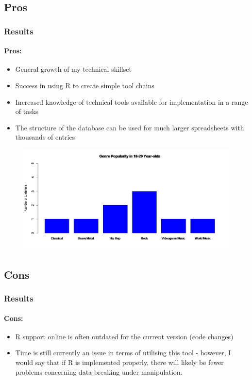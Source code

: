 \documentclass[aspectratio=1610]{beamer}
\begin{document}
\subsection{Pros}
\begin{frame}
\frametitle{Results}
\framesubtitle{Pros:}
\begin{itemize}
\item General growth of my technical skillset
\item Success in using R to create simple tool chains
\item Increased knowledge of technical tools available for implementation in a range of tasks
\item The structure of the database can be used for much larger spreadsheets with thousands of entries
\end{itemize}
\begin{figure}[h]
\includegraphics[scale=0.3]{Final}
\end{figure}
\end{frame}
\subsection{Cons}
\begin{frame}
\frametitle{Results}
\framesubtitle{Cons:}
\begin{itemize}
\item R support online is often outdated for the current version (code changes)
\item Time is still currently an issue in terms of utilising this tool - however, I would say that if R is implemented properly, there will likely be fewer problems concerning data breaking under manipulation. 
\end{itemize}
\end{frame}
\end{document}
